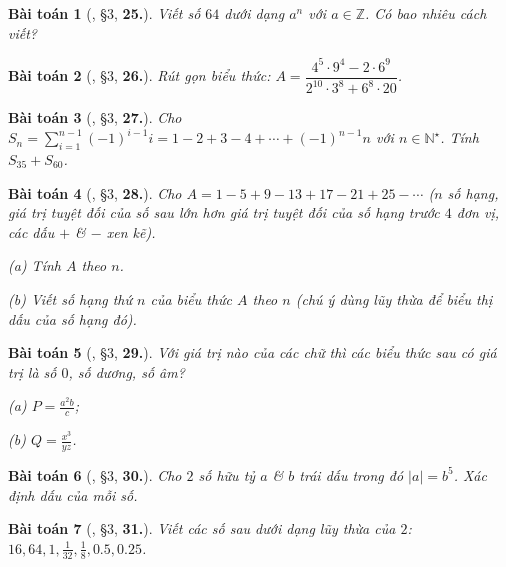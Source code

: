 \documentclass{article}
\numberwithin{equation}{section}
\newtheorem{baitoan}{Bài toán}[section]
\begin{document}
\begin{baitoan}[\cite{Binh_Toan_7_tap_1}, \S3, \textbf{25.}]
	Viết số $64$ dưới dạng $a^n$ với $a\in\mathbb{Z}$. Có bao nhiêu cách viết?
\end{baitoan}

\begin{baitoan}[\cite{Binh_Toan_7_tap_1}, \S3, \textbf{26.}]
	Rút gọn biểu thức: $A = \dfrac{4^5\cdot 9^4 - 2\cdot 6^9}{2^{10}\cdot 3^8 + 6^8\cdot 20}$.
\end{baitoan}

\begin{baitoan}[\cite{Binh_Toan_7_tap_1}, \S3, \textbf{27.}]
	Cho $S_n = \sum_{i=1}^{n-1} (-1)^{i-1}i = 1 - 2 + 3 - 4 + \cdots + (-1)^{n-1}n$ với $n\in\mathbb{N}^\star$. Tính $S_{35} + S_{60}$.
\end{baitoan}

\begin{baitoan}[\cite{Binh_Toan_7_tap_1}, \S3, \textbf{28.}]
	Cho $A = 1 - 5 + 9 - 13 + 17 - 21 + 25 - \cdots$ ($n$ số hạng, giá trị tuyệt đối của số sau lớn hơn giá trị tuyệt đối của số hạng trước $4$ đơn vị, các dấu $+$ \& $-$ xen kẽ).
	\begin{enumerate*}
		\item[(a)] Tính $A$ theo $n$.
		\item[(b)] Viết số hạng thứ $n$ của biểu thức $A$ theo $n$ (chú ý dùng lũy thừa để biểu thị dấu của số hạng đó).
	\end{enumerate*}
\end{baitoan}

\begin{baitoan}[\cite{Binh_Toan_7_tap_1}, \S3, \textbf{29.}]
	Với giá trị nào của các chữ thì các biểu thức sau có giá trị là số $0$, số dương, số âm?
	\begin{enumerate*}
		\item[(a)] $P = \frac{a^2b}{c}$;
		\item[(b)] $Q = \frac{x^3}{yz}$.
	\end{enumerate*}
\end{baitoan}

\begin{baitoan}[\cite{Binh_Toan_7_tap_1}, \S3, \textbf{30.}]
	Cho $2$ số hữu tỷ $a$ \& $b$ trái dấu trong đó $|a| = b^5$. Xác định dấu của mỗi số.
\end{baitoan}

\begin{baitoan}[\cite{Binh_Toan_7_tap_1}, \S3, \textbf{31.}]
	Viết các số sau dưới dạng lũy thừa của $2$: $16,64,1,\frac{1}{32},\frac{1}{8},0.5,0.25$.
\end{baitoan}
\end{document}
